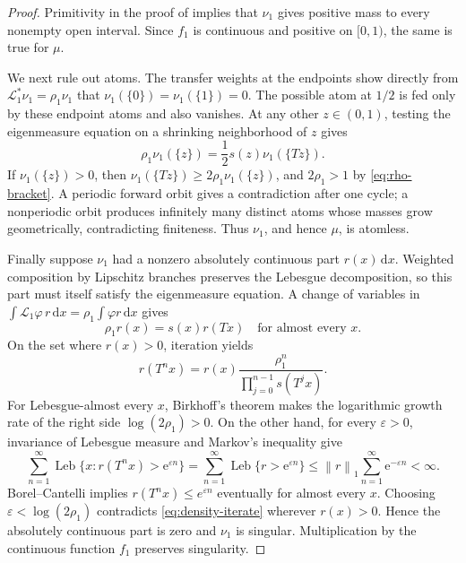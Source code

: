 \documentclass[11pt,oneside]{article}
\numberwithin{equation}{section}
\theoremstyle{definition}
\theoremstyle{remark}
\newcommand{\e}{\mathrm e}
\newcommand{\dd}{\,\mathrm d}
\newcommand{\norm}[1]{\left\lVert#1\right\rVert}
\newcommand{\Leb}{\operatorname{Leb}}
\newcommand{\Transfer}{\mathcal L}
\begin{document}
\begin{proof}
Primitivity in the proof of  implies that \(\nu_1\) gives positive mass to
every nonempty open interval.  Since \(f_1\) is continuous and positive on \([0,1)\), the
same is true for \(\mu\).

We next rule out atoms.  The transfer weights at the endpoints show directly from
\(\Transfer_1^*\nu_1=\rho_1\nu_1\) that \(\nu_1(\{0\})=\nu_1(\{1\})=0\).  The possible
atom at \(1/2\) is fed only by these endpoint atoms and also vanishes.  At any other
\(z\in(0,1)\), testing the eigenmeasure equation on a shrinking neighborhood of \(z\)
gives
\begin{equation}
 \rho_1\nu_1(\{z\})=\frac12s(z)\nu_1(\{Tz\}).
 \label{eq:atom-propagation}
\end{equation}
If \(\nu_1(\{z\})>0\), then
\(
 \nu_1(\{Tz\})\ge2\rho_1\nu_1(\{z\})
\), and \(2\rho_1>1\) by \eqref{eq:rho-bracket}.  A periodic forward orbit gives a
contradiction after one cycle; a nonperiodic orbit produces infinitely many distinct atoms
whose masses grow geometrically, contradicting finiteness.  Thus \(\nu_1\), and hence
\(\mu\), is atomless.

Finally suppose \(\nu_1\) had a nonzero absolutely continuous part \(r(x)\dd x\).  Weighted
composition by Lipschitz branches preserves the Lebesgue decomposition, so this part must
itself satisfy the eigenmeasure equation.  A change of variables in
\(
 \int\Transfer_1\varphi\,r\dd x=\rho_1\int\varphi r\dd x
\)
gives
\begin{equation}
 \rho_1r(x)=s(x)r(Tx)
 \quad\text{for almost every }x.
 \label{eq:conformal-density}
\end{equation}
On the set where \(r(x)>0\), iteration yields
\begin{equation}
 r(T^nx)=r(x)\frac{\rho_1^n}
 {\prod_{j=0}^{n-1}s(T^jx)}.
 \label{eq:density-iterate}
\end{equation}
For Lebesgue-almost every \(x\), Birkhoff's theorem makes the logarithmic growth rate of the
right side \(\log(2\rho_1)>0\).  On the other hand, for every \(\varepsilon>0\), invariance
of Lebesgue measure and Markov's inequality give
\[
 \sum_{n=1}^{\infty}
 \Leb\{x:r(T^nx)>\e^{\varepsilon n}\}
 =\sum_{n=1}^{\infty}\Leb\{r>\e^{\varepsilon n}\}
 \le\norm{r}_1\sum_{n=1}^{\infty}\e^{-\varepsilon n}<\infty.
\]
Borel--Cantelli implies \(r(T^nx)\le e^{\varepsilon n}\) eventually for almost every
\(x\).  Choosing \(\varepsilon<\log(2\rho_1)\) contradicts
\eqref{eq:density-iterate} wherever \(r(x)>0\).  Hence the absolutely continuous part is
zero and \(\nu_1\) is singular.  Multiplication by the continuous function \(f_1\) preserves
singularity.
\end{proof}
\end{document}
